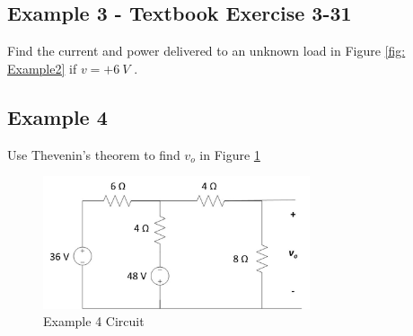 \documentclass{handout}
\begin{document}
\subsection{Example 3 - Textbook Exercise 3-31}
Find the current and power delivered to an unknown load in Figure \ref{fig: Example2} if $v=+6\ V$ . 


\newpage
\clearpage
\pagebreak

\subsection{Example 4}
Use Thevenin's theorem to find $v_o$ in Figure \ref{fig: Example4} 
\begin{figure} [h t b]
\centering
\includegraphics[width=0.7\textwidth]{Example4.jpg}
\caption{Example 4 Circuit}
\label{fig: Example4}
\end{figure}
\end{document}
